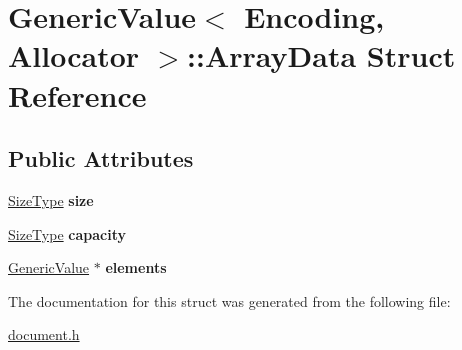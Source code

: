 \hypertarget{a02112}{}\section{Generic\+Value$<$ Encoding, Allocator $>$\+:\+:Array\+Data Struct Reference}
\label{a02112}
\subsection*{Public Attributes}
\begin{DoxyCompactItemize}
\item 
\mbox{\label{a02112_a5306856f64aea8ec53abf263ed2a35e2}} 
\hyperlink{a00560_a5ed6e6e67250fadbd041127e6386dcb5}{Size\+Type} {\bfseries size}
\item 
\mbox{\label{a02112_a0c6fe03c00e13d14b95abd31048aa1f5}} 
\hyperlink{a00560_a5ed6e6e67250fadbd041127e6386dcb5}{Size\+Type} {\bfseries capacity}
\item 
\mbox{\label{a02112_a86df976cb6f65924aca20eb9bd35553e}} 
\hyperlink{a01992}{Generic\+Value} $\ast$ {\bfseries elements}
\end{DoxyCompactItemize}


The documentation for this struct was generated from the following file\+:\begin{DoxyCompactItemize}
\item 
\hyperlink{a00476}{document.\+h}\end{DoxyCompactItemize}

